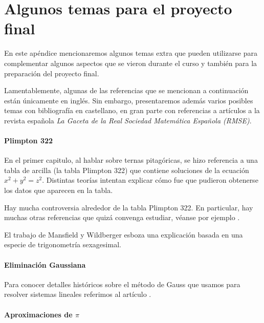 \chapter{Algunos temas para el proyecto final}

\pagestyle{plain}
\fancyhf{}
\fancyfoot[CE,CO]{\leftmark}
\fancyfoot[LE,RO]{\thepage}


En este apéndice mencionaremos algunos temas extra 
que pueden utilizarse para complementar algunos aspectos que se
vieron durante el curso y también para la preparación
del proyecto final.  

Lamentablemente, algunas de las referencias
que se mencionan a continuación 
están únicamente en inglés. Sin embargo, presentaremos además
varios posibles temas con bibliografía en castellano, en gran parte
con referencias a artículos a la revista española \emph{La Gaceta de la Real
Sociedad Matemática Española (RMSE)}. 

\subsubsection*{Plimpton 322}

En el primer capitulo, al hablar sobre ternas pitagóricas, se hizo 
referencia a una tabla de arcilla (la tabla Plimpton 322) que contiene soluciones
de la ecuación $x^2+y^2=z^2$. Distintas teorías intentan explicar cómo
fue que pudieron obtenerse los datos que aparecen en la tabla. 

Hay mucha controversia alrededor de la tabla Plimpton 322. En particular, 
hay muchas otras referencias que quizá convenga estudiar, véanse por ejemplo 
\cite{MR1917126,MR631810,MR3074274,MR1849797,MR1903149,MR3955330}.

El trabajo
\cite{MR3716328} 
de Mansfield y Wildberger esboza una explicación basada en una especie 
de trigonometría sexagesimal. 

\subsubsection*{Eliminación Gaussiana}

Para conocer detalles históricos sobre 
el método de Gauss que usamos para resolver sistemas lineales
referimos al artículo \cite{MR2775854}. 

\subsubsection*{Aproximaciones de $\pi$}

